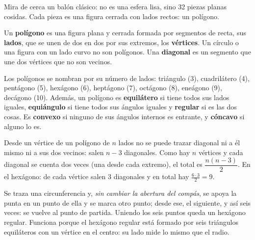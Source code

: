 \documentclass[11pt]{article}
\begin{document}
\label{tema:poligonos}

\begin{hilo}
Mira de cerca un balón clásico: no es una esfera lisa, sino 32 piezas planas cosidas. Cada
pieza es una figura cerrada con lados rectos: un polígono.
\end{hilo}

\begin{definicion}[Polígono]
Un \textbf{polígono} es una figura plana y cerrada formada por segmentos de recta, sus
\textbf{lados}, que se unen de dos en dos por sus extremos, los \textbf{vértices}. Un círculo o
una figura con un lado curvo no son polígonos. Una \textbf{diagonal} es un segmento que une dos
vértices que no son vecinos.
\end{definicion}

Los polígonos se nombran por su número de lados: triángulo (3), cuadrilátero (4), pentágono
(5), hexágono (6), heptágono (7), octágono (8), eneágono (9), decágono (10). Además, un polígono
es \textbf{equilátero} si tiene todos sus lados iguales, \textbf{equiángulo} si tiene todos sus
ángulos iguales y \textbf{regular} si es las dos cosas. Es \textbf{convexo} si ninguno de sus
ángulos internos es entrante, y \textbf{cóncavo} si alguno lo es.

\begin{ejemplo}
Desde un vértice de un polígono de $n$ lados no se puede trazar diagonal ni a él mismo ni a sus
dos vecinos: salen $n - 3$ diagonales. Como hay $n$ vértices y cada diagonal se cuenta dos veces
(una desde cada extremo), el total es $\dfrac{n(n-3)}{2}$. En el hexágono: de cada vértice salen
3 diagonales y en total hay $\frac{6 \cdot 3}{2} = 9$.
\end{ejemplo}

\begin{ejemplo}
Se traza una circunferencia y, \emph{sin cambiar la abertura del compás}, se apoya la punta en
un punto de ella y se marca otro punto; desde ese, el siguiente, y así seis veces: se vuelve al
punto de partida. Uniendo los seis puntos queda un hexágono regular. Funciona porque el
hexágono regular está formado por seis triángulos equiláteros con un vértice en el centro: su
lado mide lo mismo que el radio.

\begin{center}
\end{center}
\end{ejemplo}
\end{document}
